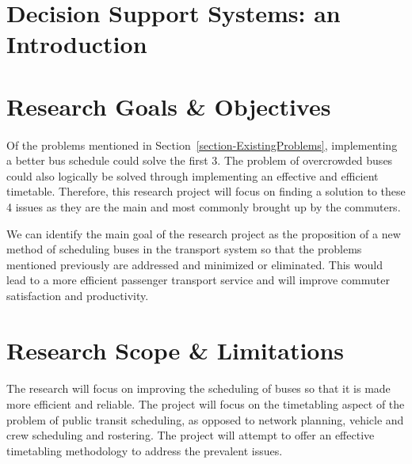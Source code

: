 \documentclass[12pt, oneside]{report}
\begin{document}
\newpage

%

\section{Decision Support Systems: an Introduction}
\label{section-DSSIntro}



\newpage

\section{Research Goals \& Objectives}
\label{section-ResearchGoalsAndObjectives}

\paragraph{ } Of the problems mentioned in Section~\ref{section-ExistingProblems}, implementing a better bus schedule could solve the first 3. The problem of overcrowded buses could also logically be solved through implementing an effective and efficient timetable. Therefore, this research project will focus on finding a solution to these 4 issues as they are the main and most commonly brought up by the commuters.

We can identify the main goal of the research project as the proposition of a new method of scheduling buses in the transport system so that the problems mentioned previously are addressed and minimized or eliminated. This would lead to a more efficient passenger transport service and will improve commuter satisfaction and productivity.

\section{Research Scope \& Limitations}
\label{section-ResearchScope}

\paragraph{ } The research will focus on improving the scheduling of buses so that it is made more efficient and reliable. The project will focus on the timetabling aspect of the problem of public transit scheduling, as opposed to network planning, vehicle and crew scheduling and rostering. The project will attempt to offer an effective timetabling methodology to address the prevalent issues.
\end{document}
